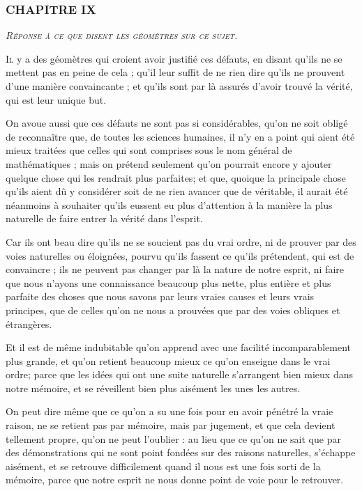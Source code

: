 \subsubsection{\centering \Large CHAPITRE IX}
\begin{center}\emph{\large\scshape Réponse à ce que disent les géomètres sur ce sujet.}\end{center}


	\lettrine{I}{l} y a des géomètres qui croient avoir justifié ces défauts, en disant qu'ils ne se mettent pas en peine de cela ; qu'il leur suffit de ne rien dire qu'ils ne prouvent d'une manière convaincante ; et qu'ils sont par là assurés d'avoir trouvé la vérité, qui est leur unique but.

On avoue aussi que ces défauts ne sont pas si considérables, qu'on ne soit obligé de reconnaître que, de toutes les sciences humaines, il n'y en a point qui aient été mieux traitées que celles qui sont comprises sous le nom général de mathématiques ; mais on prétend seulement qu'on pourrait encore y ajouter quelque chose qui les rendrait plus parfaites; et que, quoique la principale chose qu'ils aient dû y considérer soit de ne rien avancer que de véritable, il aurait été néanmoins à souhaiter qu'ils eussent eu plus d'attention à la manière la plus naturelle de faire entrer la vérité dans l'esprit.

Car ils ont beau dire qu'ils ne se soucient pas du vrai ordre, ni de prouver par des voies naturelles ou éloignées, pourvu qu'ils fassent ce qu'ils prétendent, qui est de convaincre ; ils ne peuvent pas changer par là la nature de notre esprit, ni faire que nous n'ayons une connaissance beaucoup plus nette, plus entière et plus parfaite des choses que nous savons par leurs vraies causes et leurs vrais principes, que de celles qu'on ne nous a prouvées que par des voies obliques et étrangères.

Et il est de même indubitable qu'on apprend avec une facilité incomparablement plus grande, et qu'on retient beaucoup mieux ce qu'on enseigne dans le vrai ordre; parce que les idées qui ont une suite naturelle s'arrangent bien mieux dans notre mémoire, et se réveillent bien plus aisément les unes les autres.

On peut dire même que ce qu'on a su une fois pour en avoir pénétré la vraie raison, ne se retient pas par mémoire, mais par jugement, et que cela devient tellement propre, qu'on ne peut l'oublier : au lieu que ce qu'on ne sait que par des démonstrations qui ne sont point fondées sur des raisons naturelles, s'échappe aisément, et se retrouve difficilement quand il nous est une fois sorti de la mémoire, parce que notre esprit ne nous donne point de voie pour le retrouver.

